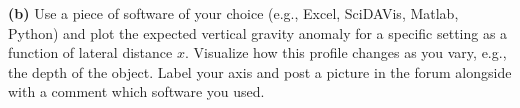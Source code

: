 \documentclass[a4paper,12pt]{article}
\begin{document}
\noindent \textbf{(b)} Use a piece of software of your choice (e.g., Excel, SciDAVis, Matlab, Python) and plot the expected vertical gravity anomaly for a specific setting as a function of lateral distance $x$. Visualize how this profile changes as you vary, e.g., the depth of the object. Label your axis and post a picture in the forum alongside with a comment which software you used.






\end{document}
